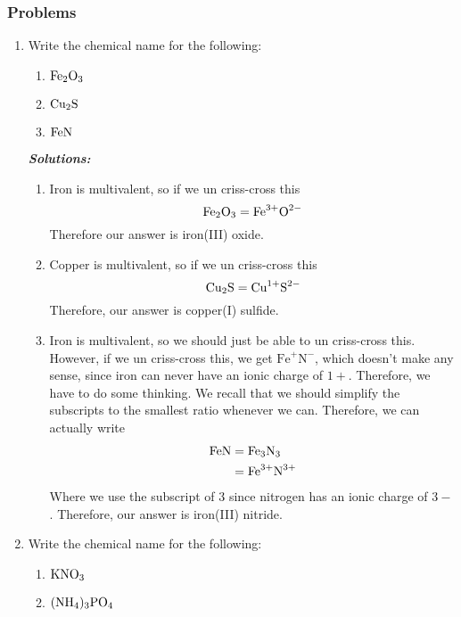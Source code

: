 \documentclass[12pt]{report}
\begin{document}
\subsubsection{Problems}
\begin{enumerate}
\setlength\itemsep{0.5em}
    \item{Write the chemical name for the following:}
        \begin{enumerate}[label=(\alph*)]
            \item{$ \ce{Fe2O3}$}
            \item{ $ \ce{Cu2S}$}
            \item{ $ \ce{FeN}$}
        \end{enumerate}
    \textit{\textbf{Solutions:}}
    \begin{enumerate}[label=(\alph*)]
        \item{Iron is multivalent, so if we un criss-cross this
                \[
                    \ce{Fe2O3}= \text{Fe}^{3+} \text{O}^{2-}
                \]
            Therefore our answer is iron(III) oxide.}
        \item{Copper is multivalent, so if we un criss-cross this
                \[
                    \ce{Cu2S}= \text{Cu}^{1+} \text{S}^{2-}
                \]
            Therefore, our answer is copper(I) sulfide.}
        \item{Iron is multivalent, so we should just be able to un criss-cross this. However, if we un criss-cross this, we get $ \text{Fe}^{+} \text{N}^{-}$, which doesn't make any sense, since iron can never have an ionic charge of $1+$. Therefore, we have to do some thinking. We recall that we should simplify the subscripts to the smallest ratio whenever we can. Therefore, we can actually write 
                \begin{align*}
                    \ce{FeN}&= \ce{Fe3N3}\\
                            &= \text{Fe}^{3+} \text{N}^{3+}
                \end{align*}
            Where we use the subscript of 3 since nitrogen has an ionic charge of $3-$. Therefore, our answer is iron(III) nitride. 
            }
    \end{enumerate}
    \item{Write the chemical name for the following:}
        \begin{enumerate}[label=(\alph*)]
            \item{ $\ce{KNO3}$}
            \item{ $\ce{(NH4)3PO4}$}

\end{enumerate}
\end{enumerate}
\end{document}
